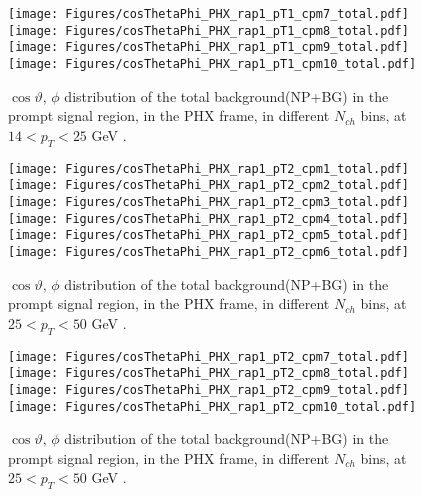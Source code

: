 \documentclass[12pt]{article}
\begin{document}
\begin{figure}[htbp]
\centering
\texttt{[image: Figures/cosThetaPhi\_PHX\_rap1\_pT1\_cpm7\_total.pdf]}
\texttt{[image: Figures/cosThetaPhi\_PHX\_rap1\_pT1\_cpm8\_total.pdf]}
\texttt{[image: Figures/cosThetaPhi\_PHX\_rap1\_pT1\_cpm9\_total.pdf]}
\texttt{[image: Figures/cosThetaPhi\_PHX\_rap1\_pT1\_cpm10\_total.pdf]}
\caption{$\cos\vartheta,\,\phi$ distribution of the total background(NP+BG) in the prompt signal region, 
	in the PHX frame, in different $N_{ch}$ bins, at $14 < p_{T} < 25$ GeV .}
\end{figure}
\clearpage

\begin{figure}[htbp]
\centering
\texttt{[image: Figures/cosThetaPhi\_PHX\_rap1\_pT2\_cpm1\_total.pdf]}
\texttt{[image: Figures/cosThetaPhi\_PHX\_rap1\_pT2\_cpm2\_total.pdf]}
\texttt{[image: Figures/cosThetaPhi\_PHX\_rap1\_pT2\_cpm3\_total.pdf]}
\texttt{[image: Figures/cosThetaPhi\_PHX\_rap1\_pT2\_cpm4\_total.pdf]}
\texttt{[image: Figures/cosThetaPhi\_PHX\_rap1\_pT2\_cpm5\_total.pdf]}
\texttt{[image: Figures/cosThetaPhi\_PHX\_rap1\_pT2\_cpm6\_total.pdf]}
\caption{$\cos\vartheta,\,\phi$ distribution of the total background(NP+BG) in the prompt signal region, 
	in the PHX frame, in different $N_{ch}$ bins, at $25 < p_{T} < 50$ GeV .}
\end{figure}
\clearpage

\begin{figure}[htbp]
\centering
\texttt{[image: Figures/cosThetaPhi\_PHX\_rap1\_pT2\_cpm7\_total.pdf]}
\texttt{[image: Figures/cosThetaPhi\_PHX\_rap1\_pT2\_cpm8\_total.pdf]}
\texttt{[image: Figures/cosThetaPhi\_PHX\_rap1\_pT2\_cpm9\_total.pdf]}
\texttt{[image: Figures/cosThetaPhi\_PHX\_rap1\_pT2\_cpm10\_total.pdf]}
\caption{$\cos\vartheta,\,\phi$ distribution of the total background(NP+BG) in the prompt signal region, 
	in the PHX frame, in different $N_{ch}$ bins, at $25 < p_{T} < 50$ GeV .}
\end{figure}
\clearpage
\end{document}
